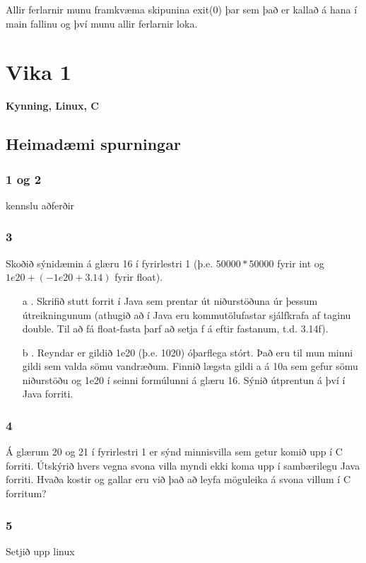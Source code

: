\documentclass{article}
\begin{document}
Allir ferlarnir munu framkvæma skipunina exit(0) þar sem það er kallað á hana í main fallinu og því munu allir ferlarnir loka.



\newpage
\section{Vika 1}
\large{\textbf{Kynning, Linux, C}}

\subsection{Heimadæmi spurningar}

\subsubsection{1 og 2}
kennslu aðferðir

\subsubsection{3}
Skoðið sýnidæmin á glæru 16 í fyrirlestri 1 (þ.e. $50000 * 50000$ fyrir int og $1e20 +
(-1e20 + 3.14)$ fyrir float).
\begin{itemize}
    \item[a]. Skrifið stutt forrit í Java sem prentar út niðurstöðuna úr þessum útreikningunum
(athugið að í Java eru kommutölufastar sjálfkrafa af taginu double. Til að fá
float-fasta þarf að setja f á eftir fastanum, t.d. 3.14f).
\item[b] . Reyndar er gildið 1e20 (þ.e. 1020) óþarflega stórt. Það eru til mun minni gildi
sem valda sömu vandræðum. Finnið lægsta gildi a á 10a sem gefur sömu
niðurstöðu og 1e20 í seinni formúlunni á glæru 16. Sýnið útprentun á því í Java
forriti.
\end{itemize}

\subsubsection{4}
Á glærum 20 og 21 í fyrirlestri 1 er sýnd minnisvilla sem getur komið upp í C forriti.
Útskýrið hvers vegna svona villa myndi ekki koma upp í sambærilegu Java forriti.
Hvaða kostir og gallar eru við það að leyfa möguleika á svona villum í C forritum?

\subsubsection{5}
Setjið upp linux
\end{document}
